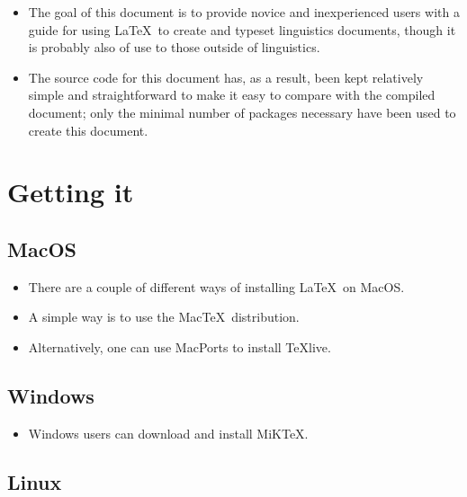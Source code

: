 \documentclass[11pt, letterpaper]{article}
\begin{document}
    \begin{itemize}
      \item The goal of this document is to provide novice and inexperienced users with a guide for using \LaTeX\ to create and typeset linguistics documents, though it is probably also of use to those outside of linguistics.
      
      \item The source code for this document has, as a result, been kept relatively simple and straightforward to make it easy to compare with the compiled document; only the minimal number of packages necessary have been used to create this document.
    \end{itemize}


  \section{Getting it}
  
  \subsection{MacOS}
  
    \begin{itemize}
      \item There are a couple of different ways of installing \LaTeX\ on MacOS.
      
      \item A simple way is to use the Mac\TeX\ distribution.
      
      \item Alternatively, one can use MacPorts to install \TeX live.
    \end{itemize}


  \subsection{Windows}
  
    \begin{itemize}
	\item Windows users can download and install MiK\TeX.
    \end{itemize}

  \subsection{Linux}
  
\end{document}
